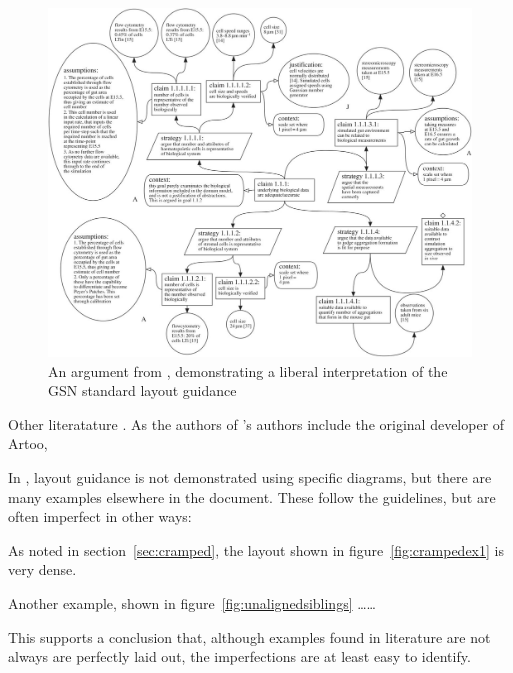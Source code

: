\begin{figure}
    \includegraphics[width=\textwidth]{graphics/aldencentral.jpg}
    \caption{An argument from \cite{royal}, demonstrating a liberal interpretation of the GSN standard layout guidance}
    \label{fig:aldencentral}
\end{figure}

Other literatature  . As the authors of \cite{royal}'s authors include the original developer of Artoo, 

In \cite{gsnstandard}, layout guidance is not demonstrated using specific diagrams, but there are many examples elsewhere in the document. These follow the guidelines, but are often imperfect in other ways:

\begin{itemize*}
    \item As noted in section~\ref{sec:cramped}, the layout shown in figure~\ref{fig:crampedex1} is very dense.
    \item Another example, shown in figure~\ref{fig:unalignedsiblings} \ldots \ldots
\end{itemize*}

This supports a conclusion that, although examples found in literature are not always are perfectly laid out, the imperfections are at least easy to identify.

